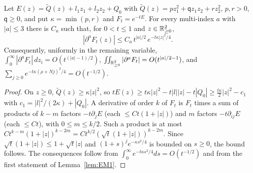 \begin{lemma}\label{lem:gauss}
Let $E(z)=\tilde Q(z)+l_1z_1+l_2z_2+Q_0$ with $\tilde Q(z)=pz_1^2+\mathsf qz_1z_2+rz_2^2$, $p,r>0$, $\mathsf q\ge0$, and put $\kappa=\min(p,r)$ and
$F_t=e^{-tE}$. For every multi-index $a$ with $|a|\le3$ there is $C_a$ such that, for $0<t\le1$ and $z\in\mathbb{R}^2_{\ge0}$,
\[
|\partial^aF_t(z)|\le C_a\,t^{|a|/2}\,e^{-t\kappa|z|^2/4}.
\]
Consequently, uniformly in the remaining variable, $\int_0^\infty|\partial^aF_t|\,dz_i=O(t^{(|a|-1)/2})$, $\iint_{\mathbb{R}^2_{\ge0}}|\partial^aF_t|=O(t^{|a|/2-1})$,
and $\sum_{j\ge0}e^{-t\kappa(\rho+Nj)^2/4}=O(t^{-1/2})$.
\end{lemma}
\begin{proof}
On $z\ge0$, $\tilde Q(z)\ge\kappa|z|^2$, so $tE(z)\ge t\kappa|z|^2-t|l||z|-t|Q_0|\ge\frac{t\kappa}2|z|^2-c_1$ with $c_1=|l|^2/(2\kappa)+|Q_0|$. A derivative of order $k$ of
$F_t$ is $F_t$ times a sum of products of $k-m$ factors $-t\partial_jE$ (each $\le Ct(1+|z|)$) and $m$ factors $-t\partial_{ij}E$ (each $\le Ct$), with
$0\le m\le k/2$. Such a product is at most $Ct^{k-m}(1+|z|)^{k-2m}=Ct^{k/2}(\sqrt t(1+|z|))^{k-2m}$. Since $\sqrt t(1+|z|)\le1+\sqrt t|z|$ and
$(1+s)^je^{-\kappa s^2/4}$ is bounded on $s\ge0$, the bound follows. The consequences follow from $\int_0^\infty e^{-t\kappa s^2/4}ds=O(t^{-1/2})$ and
from the first statement of Lemma~\ref{lem:EM1}.
\end{proof}

